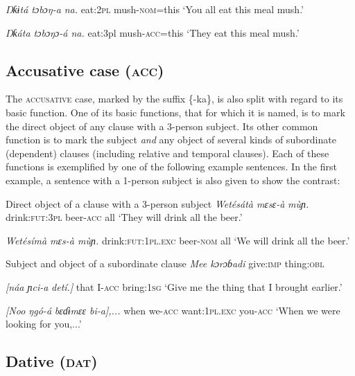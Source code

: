 \textit{Ŋƙɨtá   tɔbɔŋ-}\textit{a}\textit{ na.}
eat:\textsc{2pl}   mush-\textsc{nom}=this
‘You all eat this meal mush.’




\textit{Ŋƙáta   tɔbɔŋɔ-á na.}
eat:3pl   mush-\textsc{acc}=this
‘They eat this meal mush.’






\subsection{Accusative case (\textsc{acc})}


The \textsc{accusative} case, marked by the suffix \{-ka\}, is also split with regard to its basic function. One of its basic functions, that for which it is named, is to mark the direct object of any clause with a 3-person subject. Its other common function is to mark the subject \textit{and} any object of several kinds of subordinate (dependent) clauses (including relative and temporal clauses). Each of these functions is exemplified by one of the following example sentences. In the first example, a sentence with a 1-person subject is also given to show the contrast:




Direct object of a clause with a 3-person subject
\textit{Wetésátà   mɛsɛ-}\textit{à}\textit{   mùɲ.}
drink:\textsc{fut:3pl}   beer-\textsc{acc}   all
‘They will drink all the beer.’




\textit{Wetésímà     mɛs-à     mùɲ.}
drink:\textsc{fut:1pl.exc}   beer-\textsc{nom}   all
‘We will drink all the beer.’





Subject and object of a subordinate clause
\textit{Mee   kɔrɔɓadi   }
give:\textsc{imp}   thing:\textsc{obl}   

\textit{[náa   ɲci-}\textit{a}\textit{   detí.]}
that\textsc{  }I-\textsc{acc}   bring:\textsc{1sg}
‘Give me the thing that I brought earlier.’




\textit{[Noo   ŋgó-}\textit{á}\textit{     bɛɗɨmɛɛ     bi-}\textit{a}\textit{],...}
when   we-\textsc{acc}   want:\textsc{1pl.exc}   you-\textsc{acc}
‘When we were looking for you,...’






\subsection{Dative (\textsc{dat})}


